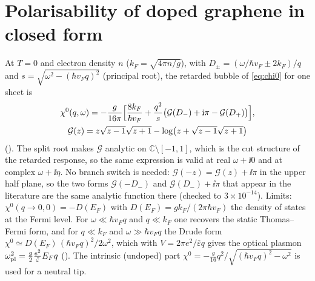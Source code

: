 \section{Polarisability of doped graphene in closed form}
\label{app:dirac}

At $T=0$ and electron density $n$ ($k_F=\sqrt{4\pi n/g}$), with $D_\pm=(\omega/\hbar v_F\pm2k_F)/q$ and
$s=\sqrt{\omega^2-(\hbar v_Fq)^2}$ (principal root), the retarded bubble of \cref{eq:chi0} for one sheet
is~\cite{Wunsch2006}
\begin{gather}
\chi^0(q,\omega)=-\frac{g}{16\pi}\Bigl[\frac{8k_F}{\hbar v_F}+\frac{q^2}{s}\bigl(\mathcal G(D_-)+\mathrm i\pi-\mathcal G(D_+)\bigr)\Bigr],\nonumber\\
\mathcal G(z)=z\sqrt{z-1}\sqrt{z+1}-\log\bigl(z+\sqrt{z-1}\sqrt{z+1}\bigr)
\end{gather}
(). The split root makes $\mathcal G$ analytic on $\mathbb C\setminus[-1,1]$, which is the
cut structure of the retarded response, so the same expression is valid at real $\omega+\ii0$ and at complex
$\omega+\ii\eta$. No branch switch is needed: $\mathcal G(-z)=\mathcal G(z)+\ii\pi$ in the upper half plane, so the
two forms $\mathcal G(-D_-)$ and $\mathcal G(D_-)+\ii\pi$ that appear in the literature are the same analytic function
there (checked to $3\times10^{-14}$). Limits: $\chi^0(q\to0,0)=-D(E_F)$
with $D(E_F)=gk_F/(2\pi\hbar v_F)$ the density of states at the Fermi level. For $\omega\ll\hbar v_Fq$ and $q\ll k_F$ one recovers the static Thomas--Fermi form, and for $q\ll k_F$
and $\omega\gg\hbar v_Fq$ the Drude form $\chi^0\simeq D(E_F)\,(\hbar v_Fq)^2/2\omega^2$, which with
$V=2\pi e^2/\bar\varepsilon q$ gives the optical plasmon
$\omega_{\rm pl}^2=\frac{g}{2}\frac{e^2}{\bar\varepsilon}E_Fq$ ().
The intrinsic (undoped) part $\chi^0=-\frac{g}{16}q^2/\sqrt{(\hbar v_Fq)^2-\omega^2}$ is used for a neutral tip.
